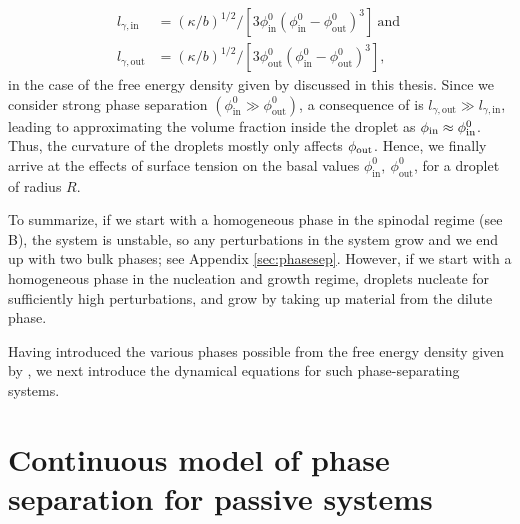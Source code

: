 \begin{subequations}
\label{eqn:l_gamma}
\begin{align}
    l_{\gamma, \mathrm{in}} &= (\kappa/b)^{1/2} /[3 \phi^{0}_\mathrm{in} \left(\phi^{0}_\mathrm{in} - \phi^{0}_\mathrm{out}\right)^{3}] \nonumber 
    \mathrm{~and~}
    \\[10pt]
    l_{\gamma, \mathrm{out}} &= (\kappa/b)^{1/2} /[3 \phi^{0}_\mathrm{out} \left(\phi^{0}_\mathrm{in} - \phi^{0}_\mathrm{out}\right)^{3}], \nonumber
\end{align}
\end{subequations}
in the case of the free energy density given by  discussed in this thesis.
Since we consider strong phase separation $(\phi^{0}_\mathrm{in} \gg \phi^{0}_\mathrm{out})$, a consequence of  is $l_{\gamma, \mathrm{out}} \gg l_{\gamma, \mathrm{in}}$, leading to approximating the volume fraction inside the droplet as $\phi_\mathrm{in} \approx \phi^{0}_\mathrm{in}$.
Thus, the curvature of the droplets mostly only affects $\phi_\mathrm{out}$.
Hence, we finally arrive at the effects of surface tension on the basal values $\phi^{0}_\mathrm{in},~\phi^{0}_\mathrm{out}$, for a droplet of radius $R$.

To summarize, if we start with a homogeneous phase in the spinodal regime (see B), the system is unstable, so any perturbations in the system grow and we end up with two bulk phases; see Appendix \ref{sec:phasesep}. 
However, if we start with a homogeneous phase in the nucleation and growth regime, droplets nucleate for sufficiently high perturbations, and grow by taking up material from the dilute phase.

Having introduced the various phases possible from the free energy density given by , we next introduce the dynamical equations for such phase-separating systems.


\section{Continuous model of phase separation for passive systems}


